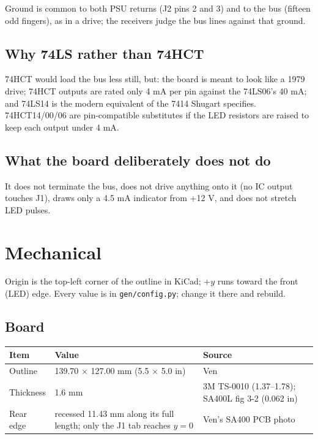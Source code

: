 \documentclass[11pt,a4paper]{article}
\begin{document}
Ground is common to both PSU returns (J2 pins 2 and 3) and to the bus (fifteen odd fingers), as in a
drive; the receivers judge the bus lines against that ground.

\subsection{Why 74LS rather than 74HCT}
74HCT would load the bus less still, but: the board is meant to look like a 1979 drive; 74HCT outputs are
rated only 4 mA per pin against the 74LS06's 40 mA; and 74LS14 is the modern equivalent of the 7414 Shugart
specifies. 74HCT14/00/06 are pin-compatible substitutes if the LED resistors are raised to keep each output
under 4 mA.

\subsection{What the board deliberately does not do}
It does not terminate the bus, does not drive anything onto it (no IC output touches J1), draws only a 4.5 mA
indicator from +12 V, and does not stretch LED pulses.

\clearpage
\section{Mechanical}\label{sec:mech}

Origin is the top-left corner of the outline in KiCad; $+y$ runs toward the front (LED) edge. Every value is
in \texttt{gen/config.py}; change it there and rebuild.

\subsection{Board}
\begin{center}
\begin{tabular}{@{}p{40mm}p{60mm}p{60mm}@{}}
\toprule
Item & Value & Source\\
\midrule
Outline & 139.70 $\times$ 127.00 mm (5.5 $\times$ 5.0 in) & Ven\\
Thickness & 1.6 mm & 3M TS-0010 (1.37--1.78); SA400L fig 3-2 (0.062 in)\\
Rear edge & recessed 11.43 mm along its full length; only the J1 tab reaches $y = 0$ & Ven's SA400 PCB photo\\
\bottomrule
\end{tabular}
\end{center}
\end{document}

